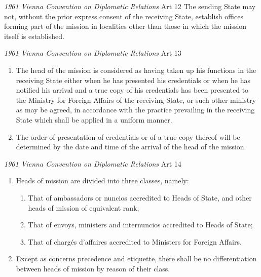 \begin{conventiondetails}{\textit{1961 Vienna Convention on Diplomatic Relations} Art 12}
    \flushleft
    The sending State may not, without the prior express consent of the receiving State, establish offices forming part of the mission in localities other than those in which the mission itself is established.
\end{conventiondetails}

\begin{conventiondetails}{\textit{1961 Vienna Convention on Diplomatic Relations} Art 13}
    \flushleft
    \begin{enumerate}
        \item The head of the mission is considered as having taken up his functions in the receiving State either when he has presented his credentials or when he has notified his arrival and a true copy of his credentials has been presented to the Ministry for Foreign Affairs of the receiving State, or such other ministry as may be agreed, in accordance with the practice prevailing in the receiving State which shall be applied in a uniform manner.
        \item The order of presentation of credentials or of a true copy thereof will be determined by the date and time of the arrival of the head of the mission.
    \end{enumerate}
\end{conventiondetails}

\begin{conventiondetails}{\textit{1961 Vienna Convention on Diplomatic Relations} Art 14}
    \flushleft
    \begin{enumerate}
        \item Heads of mission are divided into three classes, namely:
        \begin{enumerate}
            \item That of ambassadors or nuncios accredited to Heads of State, and other heads of mission of equivalent rank;
            \item That of envoys, ministers and internuncios accredited to Heads of State;
            \item That of chargés d'affaires accredited to Ministers for Foreign Affairs.
        \end{enumerate}
        \item Except as concerns precedence and etiquette, there shall be no differentiation between heads of mission by reason of their class.
    \end{enumerate}
\end{conventiondetails}


